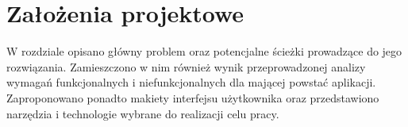 \chapter{Założenia projektowe}
W rozdziale opisano główny problem oraz potencjalne ścieżki prowadzące do jego rozwiązania. Zamieszczono w nim również wynik przeprowadzonej analizy wymagań funkcjonalnych i niefunkcjonalnych dla mającej powstać aplikacji. Zaproponowano ponadto makiety interfejsu użytkownika oraz przedstawiono narzędzia i technologie wybrane do realizacji celu pracy.





